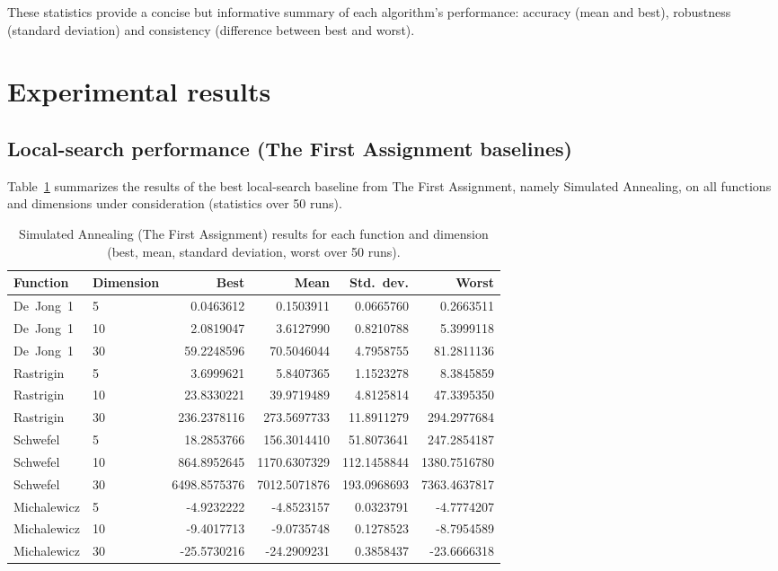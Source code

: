 \documentclass[a4paper,11pt]{article}
\begin{document}
These statistics provide a concise but informative summary of each algorithm's
performance: accuracy (mean and best), robustness (standard deviation) and
consistency (difference between best and worst).

\section{Experimental results}
\label{sec:results}

\clearpage
\subsection{Local-search performance (The First Assignment baselines)}

\vspace{1em}

Table~\ref{tab:h1-sa} summarizes the results of the best local-search baseline
from The First Assignment, namely Simulated Annealing, on all functions and dimensions under
consideration (statistics over 50 runs).

\vspace{1.5em}

\begin{table}[ht]
\centering
\caption{Simulated Annealing (The First Assignment) results for each function and dimension
(best, mean, standard deviation, worst over 50 runs).}
\label{tab:h1-sa}
\renewcommand{\arraystretch}{1.3}
\begin{tabular}{llrrrr}
\toprule
Function & Dimension & Best & Mean & Std.\ dev. & Worst \\
\midrule
De~Jong~1   & 5  & 0.0463612  & 0.1503911  & 0.0665760  & 0.2663511  \\
De~Jong~1   & 10 & 2.0819047  & 3.6127990  & 0.8210788  & 5.3999118  \\
De~Jong~1   & 30 & 59.2248596 & 70.5046044 & 4.7958755  & 81.2811136 \\
Rastrigin   & 5  & 3.6999621  & 5.8407365  & 1.1523278  & 8.3845859  \\
Rastrigin   & 10 & 23.8330221 & 39.9719489 & 4.8125814  & 47.3395350 \\
Rastrigin   & 30 & 236.2378116 & 273.5697733 & 11.8911279 & 294.2977684 \\
Schwefel    & 5  & 18.2853766  & 156.3014410 & 51.8073641  & 247.2854187 \\
Schwefel    & 10 & 864.8952645 & 1170.6307329 & 112.1458844 & 1380.7516780 \\
Schwefel    & 30 & 6498.8575376 & 7012.5071876 & 193.0968693 & 7363.4637817 \\
Michalewicz & 5  & -4.9232222  & -4.8523157  & 0.0323791  & -4.7774207 \\
Michalewicz & 10 & -9.4017713  & -9.0735748  & 0.1278523  & -8.7954589 \\
Michalewicz & 30 & -25.5730216 & -24.2909231 & 0.3858437  & -23.6666318 \\
\bottomrule
\end{tabular}
\end{table}
\end{document}
